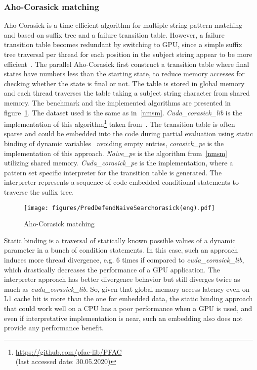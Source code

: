 \subsubsection{Aho-Corasick matching}
Aho-Corasick is a time efficient algorithm for
multiple string pattern matching~\cite{Aho-Corasick}
and based on suffix tree and a failure transition table.
However, a failure transition table becomes redundant by switching
to GPU, since a simple suffix tree traversal per thread for each
position in the subject string appear to be more efficient~\cite{PFAC}.
The parallel Aho-Corasick first construct a transition table where final
states have numbers less than the starting state, to reduce memory accesses
for checking whether the state is final or not. The table is stored in
global memory and each thread traverses the table taking a subject
string character from shared memory. The benchmark and the implemented
algorithms are presented in figure~\ref{fig:my_corasick}. The dataset used is
the same as in~\ref{nmsm}. \emph{Cuda\_corasick\_lib} is the implementation
of this algorithm\footnote{\url{https://github.com/pfac-lib/PFAC} \\
 (last accessed date: 30.05.2020)} taken from~\cite{PFAC}. The transition table is often sparse and could be embedded into the code during partial evaluation using static binding of dynamic variables~\cite{Jones1993} avoiding empty entries, \emph{corasick\_pe} is the implementation of this approach. \emph{Naive\_pe} is the algorithm from~\ref{nmsm} utilizing shared memory. \emph{Cuda\_corasick\_pe} is the implementation, where a pattern set specific interpreter for the transition table is generated. The interpreter represents a sequence of code-embedded conditional statements to traverse the suffix tree.


\begin{figure}[h!]
    \centering
    \texttt{[image: figures/PredDefendNaiveSearchorasick(eng).pdf]}
    \caption{Aho-Corasick matching}
    \label{fig:my_corasick}
\end{figure}

Static binding is a traversal of statically known possible values of a dynamic
parameter in a bunch of condition statements. In this case, such an approach
induces more thread divergence, e.g. 6 times if compared to \emph{cuda\_corasick\_lib},
which drastically decreases the performance of a GPU application.
The interpreter approach has better divergence behavior but still diverges
twice as much as \emph{cuda\_corasick\_lib}. So, given that global memory access
latency even on L1 cache hit is more than the one for embedded data,
the static binding approach that could work well on a CPU has a poor
performance when a GPU is used, and even if interpretative implementation is
near, such an embedding also does not provide any performance benefit.

